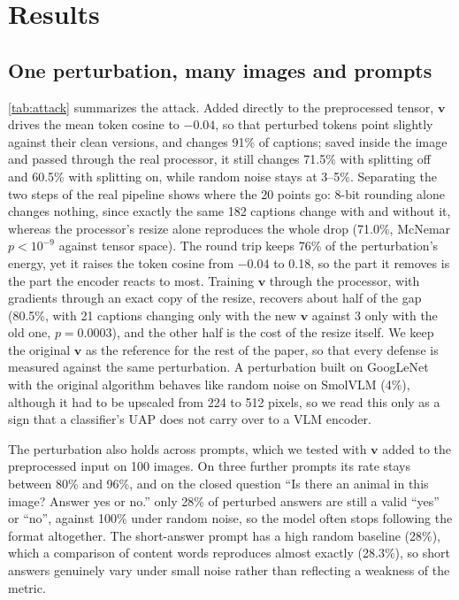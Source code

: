 \documentclass[10pt,twocolumn,letterpaper]{article}
\newcommand{\vv}{\boldsymbol{v}}
\begin{document}
\section{Results}
\label{sec:results}

\subsection{One perturbation, many images and prompts}
\label{sec:attack}

\cref{tab:attack} summarizes the attack. Added directly to the preprocessed tensor, $\vv$ drives the mean token cosine to $-0.04$, so that perturbed tokens point slightly against their clean versions, and changes 91\% of captions; saved inside the image and passed through the real processor, it still changes 71.5\% with splitting off and 60.5\% with splitting on, while random noise stays at 3--5\%. Separating the two steps of the real pipeline shows where the 20 points go: 8-bit rounding alone changes nothing, since exactly the same 182 captions change with and without it, whereas the processor's resize alone reproduces the whole drop (71.0\%, McNemar $p<10^{-9}$ against tensor space). The round trip keeps 76\% of the perturbation's energy, yet it raises the token cosine from $-0.04$ to 0.18, so the part it removes is the part the encoder reacts to most. Training $\vv$ through the processor, with gradients through an exact copy of the resize, recovers about half of the gap (80.5\%, with 21 captions changing only with the new $\vv$ against 3 only with the old one, $p=0.0003$), and the other half is the cost of the resize itself. We keep the original $\vv$ as the reference for the rest of the paper, so that every defense is measured against the same perturbation. A perturbation built on GoogLeNet with the original algorithm behaves like random noise on SmolVLM (4\%), although it had to be upscaled from 224 to 512 pixels, so we read this only as a sign that a classifier's UAP does not carry over to a VLM encoder.

The perturbation also holds across prompts, which we tested with $\vv$ added to the preprocessed input on 100 images. On three further prompts its rate stays between 80\% and 96\%, and on the closed question ``Is there an animal in this image? Answer yes or no.'' only 28\% of perturbed answers are still a valid ``yes'' or ``no'', against 100\% under random noise, so the model often stops following the format altogether. The short-answer prompt has a high random baseline (28\%), which a comparison of content words reproduces almost exactly (28.3\%), so short answers genuinely vary under small noise rather than reflecting a weakness of the metric.
\end{document}
